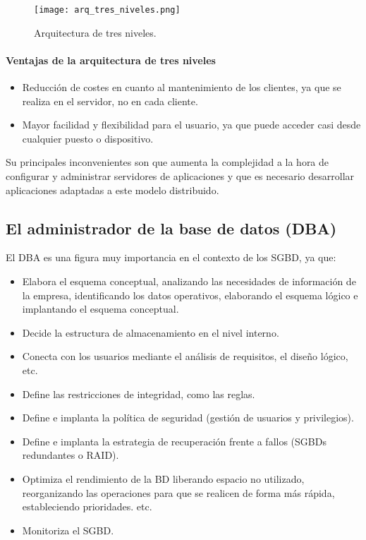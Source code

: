 \documentclass[12pt,spanish]{article}
\numberwithin{definition}{subsection}
\begin{document}
\begin{figure}[H]
\centering
\texttt{[image: arq\_tres\_niveles.png]}
\caption{Arquitectura de tres niveles.}
\end{figure}

\paragraph{Ventajas de la arquitectura de tres niveles}

\begin{itemize}
	\item Reducción de costes en cuanto al mantenimiento de los clientes, ya que se realiza en el servidor, no en cada cliente.
	\item Mayor facilidad y flexibilidad para el usuario, ya que puede acceder casi desde cualquier puesto o dispositivo.
\end{itemize}

Su principales inconvenientes son que aumenta la complejidad a la hora de configurar y administrar servidores de aplicaciones y que es necesario desarrollar aplicaciones adaptadas a este modelo distribuido.
\newpage
\subsection{El administrador de la base de datos (DBA)}

El DBA es una figura muy importancia en el contexto de los SGBD, ya que:
\begin{itemize}
	\item Elabora el esquema conceptual, analizando las necesidades de información de la empresa, identificando los datos operativos, elaborando el esquema lógico e implantando el esquema conceptual.
	\item Decide la estructura de almacenamiento en el nivel interno.
	\item Conecta con los usuarios mediante el análisis de requisitos, el diseño lógico, etc.
	\item Define las restricciones de integridad, como las reglas.
	\item Define e implanta la política de seguridad (gestión de usuarios y privilegios).
	\item Define e implanta la estrategia de recuperación frente a fallos (SGBDs redundantes o RAID).
	\item Optimiza el rendimiento de la BD liberando espacio no utilizado, reorganizando las operaciones para que se realicen de forma más rápida,  estableciendo prioridades. etc.
	\item Monitoriza el SGBD.
	
\end{itemize}
\end{document}

